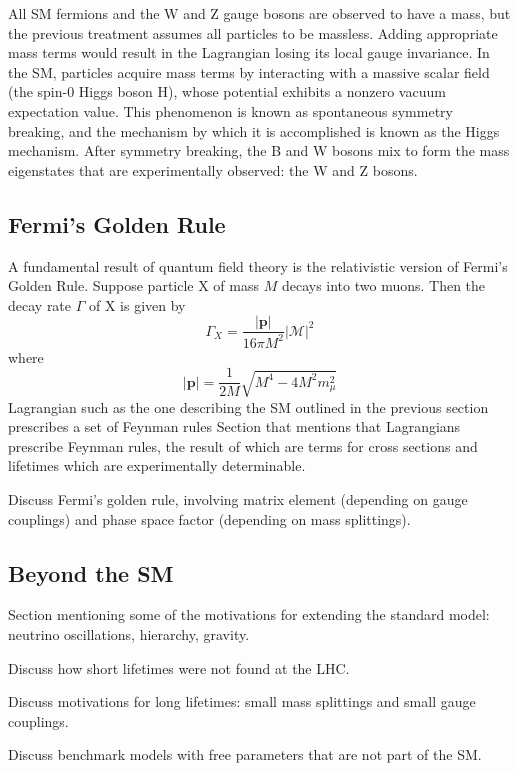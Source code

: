 All SM fermions and the W and Z gauge bosons are observed to have a mass, but the previous treatment assumes all particles to be massless.
Adding appropriate mass terms would result in the Lagrangian losing its local gauge invariance.
In the SM, particles acquire mass terms by interacting with a massive scalar field (the spin-0 Higgs boson H), whose potential exhibits a nonzero vacuum expectation value.
This phenomenon is known as spontaneous symmetry breaking, and the mechanism by which it is accomplished is known as the Higgs mechanism.
After symmetry breaking, the B and W bosons mix to form the mass eigenstates that are experimentally observed: the W and Z bosons.

\subsection{Fermi's Golden Rule}
A fundamental result of quantum field theory is the relativistic version of Fermi's Golden Rule.
Suppose particle X of mass $M$ decays into two muons. Then the decay rate $\Gamma$ of X is given by
\begin{equation}
  \Gamma_X = \frac{|\mathbf{p}|}{16\pi M^2}\left|\mathcal{M}\right|^2 
  \label{eq:sm:fermi}
\end{equation}
where 
\begin{equation}
  |\mathbf{p}| = \frac{1}{2M}\sqrt{M^4 - 4M^2m_\mu^2}
  \label{eq:sm:p}
\end{equation}
Lagrangian such as the one describing the SM outlined in the previous section prescribes a set of Feynman rules
Section that mentions that Lagrangians prescribe Feynman rules, the result of which are terms for cross sections and lifetimes which are experimentally determinable.

Discuss Fermi's golden rule, involving matrix element (depending on gauge couplings) and phase space factor (depending on mass splittings).

\subsection{Beyond the SM}
Section mentioning some of the motivations for extending the standard model: neutrino oscillations, hierarchy, gravity.

Discuss how short lifetimes were not found at the LHC.

Discuss motivations for long lifetimes: small mass splittings and small gauge couplings.

Discuss benchmark models with free parameters that are not part of the SM.

\cite{STRASSLER2008263}
